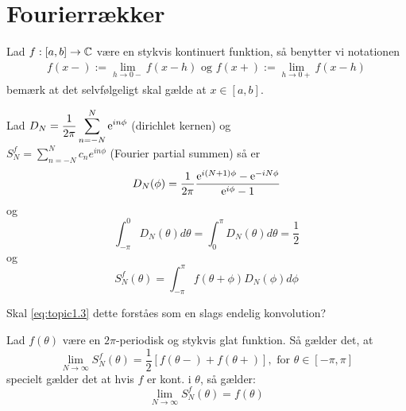 \chapter{Fourierrækker}
Lad $f: [a, b] \to \mathbb{C}$ være en  stykvis kontinuert funktion, så benytter vi notationen \begin{align*}
  f(x-) := \lim_{h \to 0-} f(x - h) \text{ og }  f(x+) := \lim_{h \to 0+} f(x - h)
\end{align*}
bemærk at det selvfølgeligt skal gælde at $x \in [a, b]$.
\begin{lemma}
  Lad $D_{N} = \displaystyle \frac{1}{2\pi} \sum_{n=-N}^N \mathrm{e}^{i n \phi}$ (dirichlet kernen) og \\ $S_{N}^{f} = \sum_{n=-N}^N c_{n} e^{in \phi}$ (Fourier partial summen) så er
  \begin{equation}\label{eq:topic1.1}
    D_{N}(\phi) = \frac{1}{2\pi} \frac{\mathrm{e}^{i (N + 1) \phi} - \mathrm{e}^{-i N \phi}}{\mathrm{e}^{i \phi} - 1}
  \end{equation}
  og
  \begin{equation}\label{eq:topic1.2}
    \int_{-\pi}^0  D_{N}(\theta) d \theta = \int_0^{\pi} D_{N}(\theta) d \theta = \frac{1}{2}
  \end{equation}
  og
  \begin{equation}\label{eq:topic1.3}
    S_{N}^{f}(\theta) = \int_{-\pi}^{\pi} f(\theta + \phi) D_{N}(\phi) d \phi
  \end{equation}
\end{lemma}
\begin{remark}
  Skal \eqref{eq:topic1.3} dette forståes som en slags endelig konvolution?
\end{remark}
\begin{theorem}
  Lad $f(\theta)$ være en $2\pi$-periodisk og stykvis glat funktion. Så gælder det, at
  \begin{equation*}
    \lim_{N \to \infty} S_{N}^{f}(\theta) = \frac{1}{2}[f(\theta-) + f(\theta+)], \text{ for } \theta \in [-\pi, \pi]
  \end{equation*}
  specielt gælder det at hvis $f$ er kont. i $\theta$, så gælder:
  \begin{equation*}
    \lim_{N \to \infty} S_{N}^{f}(\theta) = f(\theta)
  \end{equation*}
\end{theorem}

